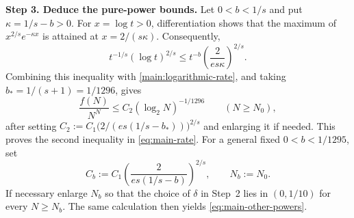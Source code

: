 \documentclass[twoside]{aomart}
\makeatletter
\theoremstyle{paperplain}
\theoremstyle{paperdefinition}
\renewenvironment{proof}[1][\proofname]{\par\pushQED{\qed}%
  \normalfont\topsep6\p@\@plus3\p@\relax\trivlist
  \item[\hskip\labelsep\itshape #1\@addpunct{.}]\ignorespaces
}{\popQED\endtrivlist\@endpefalse}
\numberwithin{equation}{section}
\makeatother
\begin{document}
\begin{proof}[Proof of \Cref{thm:main}]
\par
\medskip
\noindent\textbf{Step 3. Deduce the pure-power bounds.}
Let $0<b<1/s$ and put $\kappa=1/s-b>0$.
For $x=\log t>0$, differentiation shows that the maximum of
$x^{2/s}e^{-\kappa x}$ is attained at $x=2/(s\kappa)$.
Consequently,
\begin{equation*}
 t^{-1/s}(\log t)^{2/s}
 \le t^{-b}\left(\frac{2}{e s\kappa}\right)^{2/s}.
\end{equation*}
Combining this inequality with \eqref{main:logarithmic-rate}, and taking
$b_*=1/(s+1)=1/1296$, gives
\begin{equation*}
 \frac{f(N)}{N^N}\le C_2(\log_2N)^{-1/1296}
 \qquad(N\ge N_0),
\end{equation*}
after setting
$C_2:=C_1\bigl(2/(e s(1/s-b_*))\bigr)^{2/s}$ and enlarging it if needed.
This proves the second inequality in \eqref{eq:main-rate}.  For a general
fixed $0<b<1/1295$, set
\[
 C_b:=C_1\left(\frac{2}{e s(1/s-b)}\right)^{2/s},
 \qquad N_b:=N_0.
\]
If necessary enlarge $N_b$ so that the choice of $\delta$ in Step~2 lies
in $(0,1/10)$ for every $N\ge N_b$.  The same calculation then yields
\eqref{eq:main-other-powers}.
\end{proof}
\end{document}
